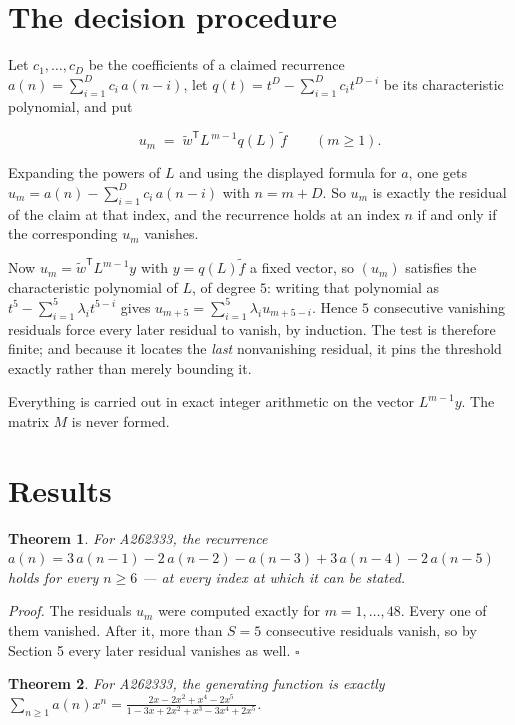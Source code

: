 \documentclass[11pt]{article}
\newtheorem{theorem}{Theorem}
\theoremstyle{definition}
\begin{document}
\section{The decision procedure}

Let $c_1,\dots,c_D$ be the coefficients of a claimed recurrence $a(n) = \sum_{i=1}^{D} c_i\,a(n-i)$, let $q(t) = t^{D} - \sum_{i=1}^{D} c_i t^{D-i}$ be its characteristic polynomial, and put

\[u_m \;=\; \tilde w^{\mathsf T} L^{\,m-1} q(L)\,\tilde f \qquad (m \ge 1).\]

Expanding the powers of $L$ and using the displayed formula for $a$, one gets $u_m = a(n) - \sum_{i=1}^{D} c_i\,a(n-i)$ with $n = m + D$. So $u_m$ is exactly the residual of the claim at that index, and the recurrence holds at an index $n$ if and only if the corresponding $u_m$ vanishes.

Now $u_m = \tilde w^{\mathsf T} L^{m-1} y$ with $y = q(L)\tilde f$ a fixed vector, so $(u_m)$ satisfies the characteristic polynomial of $L$, of degree $5$: writing that polynomial as $t^{5} - \sum_{i=1}^{5} \lambda_i t^{5-i}$ gives $u_{m+5} = \sum_{i=1}^{5} \lambda_i u_{m+5-i}$. Hence $5$ consecutive vanishing residuals force every later residual to vanish, by induction. The test is therefore finite; and because it locates the {\itshape last} nonvanishing residual, it pins the threshold exactly rather than merely bounding it.

Everything is carried out in exact integer arithmetic on the vector $L^{m-1}y$. The matrix $M$ is never formed.

\section{Results}

\begin{theorem} For A262333, the recurrence $a(n) = 3\,a(n-1) - 2\,a(n-2) - a(n-3) + 3\,a(n-4) - 2\,a(n-5)$ holds for every $n \ge 6$ --- at every index at which it can be stated.\end{theorem}

{\itshape Proof.} The residuals $u_m$ were computed exactly for $m = 1,\dots,48$. Every one of them vanished. After it, more than $S = 5$ consecutive residuals vanish, so by Section 5 every later residual vanishes as well. $\square$

\begin{theorem} For A262333, the generating function is exactly $\sum_{n\ge 1} a(n)x^n = \frac{2x - 2x^{2} + x^{4} - 2x^{5}}{1 - 3x + 2x^{2} + x^{3} - 3x^{4} + 2x^{5}}$.\end{theorem}
\end{document}
